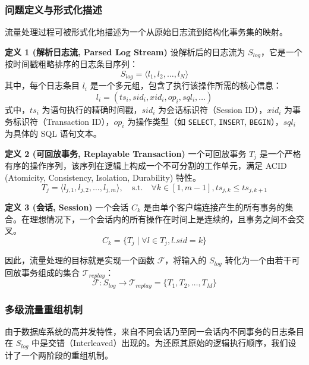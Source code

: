 \subsubsection{问题定义与形式化描述}
流量处理过程可被形式化地描述为一个从原始日志流到结构化事务集的映射。

\textbf{定义 1 (解析日志流, Parsed Log Stream)}
设解析后的日志流为 $S_{log}$，它是一个按时间戳粗略排序的日志条目序列：
\begin{equation}
    S_{log} = \langle l_1, l_2, \dots, l_N \rangle
\end{equation}
其中，每个日志条目 $l_i$ 是一个多元组，包含了执行该操作所需的核心信息：
\begin{equation}
    l_i = (ts_i, sid_i, xid_i, op_i, sql_i, \dots)
\end{equation}
式中，$ts_i$ 为语句执行的精确时间戳，$sid_i$ 为会话标识符（Session ID），$xid_i$ 为事务标识符（Transaction ID），$op_i$ 为操作类型（如 \texttt{SELECT}, \texttt{INSERT}, \texttt{BEGIN}），$sql_i$ 为具体的 SQL 语句文本。

\textbf{定义 2 (可回放事务, Replayable Transaction)}
一个可回放事务 $T_j$ 是一个严格有序的操作序列，该序列在逻辑上构成一个不可分割的工作单元，满足 ACID (Atomicity, Consistency, Isolation, Durability) 特性。
\begin{equation}
    T_j = \langle l_{j,1}, l_{j,2}, \dots, l_{j,m} \rangle, \quad \text{s.t.} \quad \forall k \in [1, m-1], ts_{j,k} \le ts_{j,k+1}
\end{equation}

\textbf{定义 3 (会话, Session)}
一个会话 $C_k$ 是由单个客户端连接产生的所有事务的集合。在理想情况下，一个会话内的所有操作在时间上是连续的，且事务之间不会交叉。
\begin{equation}
    C_k = \{ T_j \mid \forall l \in T_j, l.sid = k \}
\end{equation}

因此，流量处理的目标就是实现一个函数 $\mathcal{F}$，将输入的 $S_{log}$ 转化为一个由若干可回放事务组成的集合 $\mathcal{T}_{replay}$：
\begin{equation}
    \mathcal{F}: S_{log} \rightarrow \mathcal{T}_{replay} = \{ T_1, T_2, \dots, T_M \}
\end{equation}

\subsubsection{多级流量重组机制}
由于数据库系统的高并发特性，来自不同会话乃至同一会话内不同事务的日志条目在 $S_{log}$ 中是交错（Interleaved）出现的。为还原其原始的逻辑执行顺序，我们设计了一个两阶段的重组机制。

